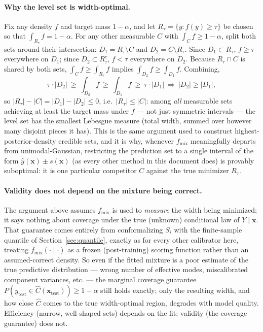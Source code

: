 \documentclass[11pt]{article}
\begin{document}
\paragraph{Why the level set is width-optimal.} Fix any density $f$ and target mass $1-\alpha$,
and let $R_\tau=\{y:f(y)\ge\tau\}$ be chosen so that $\int_{R_\tau}f=1-\alpha$. For any other
measurable $C$ with $\int_C f\ge 1-\alpha$, split both sets around their intersection:
$D_1=R_\tau\setminus C$ and $D_2=C\setminus R_\tau$. Since $D_1\subset R_\tau$, $f\ge\tau$
everywhere on $D_1$; since $D_2\subset R_\tau^c$, $f<\tau$ everywhere on $D_2$. Because
$R_\tau\cap C$ is shared by both sets, $\int_C f\ge\int_{R_\tau}f$ implies
$\int_{D_2}f\ge\int_{D_1}f$.
Combining,
\begin{equation}
\tau\cdot|D_2| \ \ge\ \int_{D_2}f \ \ge\ \int_{D_1}f \ \ge\ \tau\cdot|D_1|
\ \Longrightarrow\ |D_2|\ge|D_1|,
\end{equation}
so $|R_\tau|-|C|=|D_1|-|D_2|\le 0$, i.e.\ $|R_\tau|\le|C|$: among \emph{all} measurable sets
achieving at least the target mass under $f$ — not just symmetric intervals — the level set has
the smallest Lebesgue measure (total width, summed over however many disjoint pieces it has).
This is the same argument used to construct highest-posterior-density credible sets, and it is
why, whenever $f_{\mathrm{mix}}$ meaningfully departs from unimodal-Gaussian, restricting the
prediction set to a single interval of the form $\hat y(\bm x)\pm s(\bm x)$ (as every other
method in this document does) is provably suboptimal: it is one particular competitor $C$
against the true minimizer $R_\tau$.

\paragraph{Validity does not depend on the mixture being correct.} The argument above assumes
$f_{\mathrm{mix}}$ is used to \emph{measure} the width being minimized; it says nothing about
coverage under the true (unknown) conditional law of $Y\mid\bm x$. That guarantee comes entirely
from conformalizing $S_i$ with the finite-sample quantile of Section~\ref{sec:quantile}, exactly
as for every other calibrator here, treating $f_{\mathrm{mix}}(\cdot\mid\cdot)$ as a frozen
(post-training) scoring function rather than an assumed-correct density. So even if the fitted
mixture is a poor estimate of the true predictive distribution — wrong number of effective
modes, miscalibrated component variances, etc. — the marginal coverage guarantee
$P(y_{\mathrm{test}}\in\hat C(\bm x_{\mathrm{test}}))\ge 1-\alpha$ still holds exactly; only the
resulting width, and how close $\hat C$ comes to the true width-optimal region, degrades with
model quality. Efficiency (narrow, well-shaped sets) depends on the fit; validity (the coverage
guarantee) does not.
\end{document}
